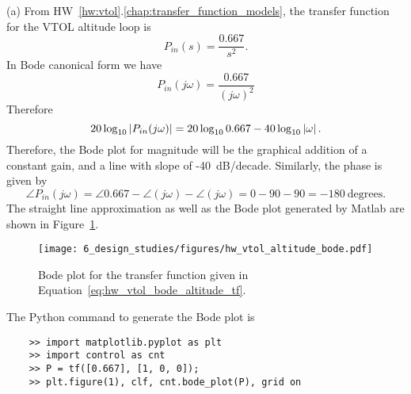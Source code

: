 (a) From HW~\ref{hw:vtol}.\ref{chap:transfer_function_models}, the transfer function for the VTOL altitude loop is 
\begin{equation}\label{eq:hw_vtol_bode_altitude_tf}
P_{in}(s) = \frac{0.667}{s^2}.
\end{equation}
In Bode canonical form we have
\[
P_{in}(j\omega) = \frac{0.667}{(j\omega)^2}
\]
Therefore
\[ 
20\log_{10}\left|P_{in}(j\omega)\right|=
	20\log_{10} 0.667 
	-40\log_{10}\left|\omega\right|.
\]
Therefore, the Bode plot for magnitude will be the graphical addition of a constant gain, and a line with slope of -40~dB/decade.
Similarly, the phase is given by
\[
\angle P_{in}(j\omega) = 
	\angle 0.667 
	- \angle (j\omega)
	- \angle (j\omega) = 0 - 90 - 90 = -180~\text{degrees}.
\]
The straight line approximation as well as the Bode plot generated by Matlab are shown in Figure~\ref{fig:hw_vtol_altitude_bode}.
\begin{figure}[H]
   \centering
   \texttt{[image: 6\_design\_studies/figures/hw\_vtol\_altitude\_bode.pdf]}
   \caption{Bode plot for the transfer function given in Equation~\eqref{eq:hw_vtol_bode_altitude_tf}.}
   \label{fig:hw_vtol_altitude_bode}
\end{figure}
The Python command to generate the Bode plot is
\begin{lstlisting}
	>> import matplotlib.pyplot as plt
	>> import control as cnt
	>> P = tf([0.667], [1, 0, 0]);
	>> plt.figure(1), clf, cnt.bode_plot(P), grid on
\end{lstlisting}

